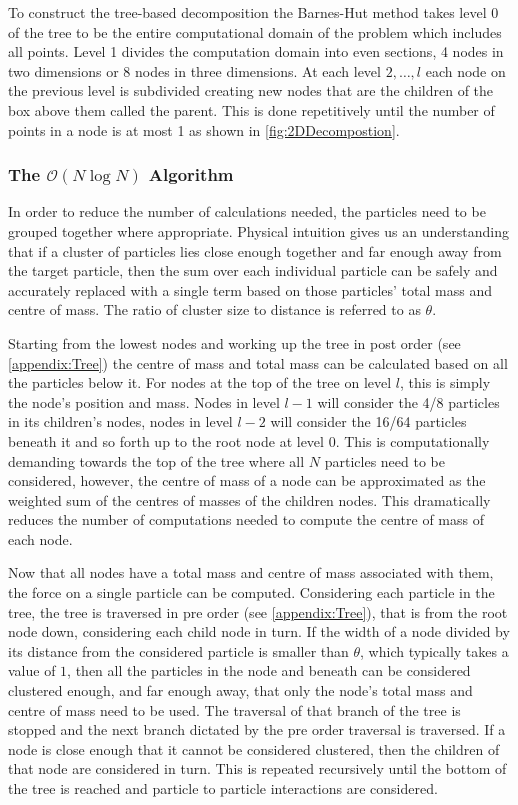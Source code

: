 To construct the tree-based decomposition the Barnes-Hut method takes level 0 of the tree to be the entire computational domain of the problem which includes all points. Level 1 divides the computation domain into even sections, 4 nodes in two dimensions or 8 nodes in three dimensions. At each level $2,\dots,l$ each node on the previous level is subdivided creating new nodes that are the children of the box above them called the parent. This is done repetitively until the number of points in a node is at most 1 as shown in \cref{fig:2DDecompostion}.

\subsubsection{\texorpdfstring{The $\mathcal{O}(N\log N)$ Algorithm}{The O(NlogN) Algorithm}}

In order to reduce the number of calculations needed, the particles need to be grouped together where appropriate. Physical intuition gives us an understanding that if a cluster of particles lies close enough together and far enough away from the target particle, then the sum over each individual particle can be safely and accurately replaced with a single term based on those particles' total mass and centre of mass. The ratio of cluster size to distance is referred to as $\theta$. 

Starting from the lowest nodes and working up the tree in post order (see \cref{appendix:Tree}) the centre of mass and total mass can be calculated based on all the particles below it. For nodes at the top of the tree on level $l$, this is simply the node's position and mass. Nodes in level $l-1$ will consider the 4/8 particles in its children's nodes, nodes in level $l-2$ will consider the 16/64 particles beneath it and so forth up to the root node at level $0$. This is computationally demanding towards the top of the tree where all $N$ particles need to be considered, however, the centre of mass of a node can be approximated as the weighted sum of the centres of masses of the children nodes. This dramatically reduces the number of computations needed to compute the centre of mass of each node. 

Now that all nodes have a total mass and centre of mass associated with them, the force on a single particle can be computed. Considering each particle in the tree, the tree is traversed in pre order (see \cref{appendix:Tree}), that is from the root node down, considering each child node in turn. If the width of a node divided by its distance from the considered particle is smaller than $\theta$, which typically takes a value of $1$, then all the particles in the node and beneath can be considered clustered enough, and far enough away, that only the node's total mass and centre of mass need to be used. The traversal of that branch of the tree is stopped and the next branch dictated by the pre order traversal is traversed. If a node is close enough that it cannot be considered clustered, then the children of that node are considered in turn. This is repeated recursively until the bottom of the tree is reached and particle to particle interactions are considered.

